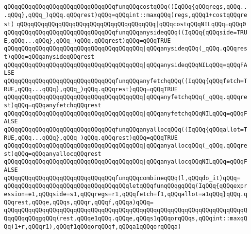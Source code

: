 \newline
\verb|qQQqqQQqqQQqqQQqqQQqqQQqqQQqqQQqfunqQQqcostqQQq((IqQQq{qQQqregs,qQQq...qQQq},qQQq_)qQQq.qQQqrest)qQQq=qQQqint::maxqQQq(regs,qQQq1+costqQQqrest)|\newline
\verb|qQQqqQQqqQQqqQQqqQQqqQQqqQQqqQQqqQQqqQQq|\verb#|qQQqcostqQQqNILqQQq=qQQq0#\newline
\newline
\verb|qQQqqQQqqQQqqQQqqQQqqQQqqQQqqQQqfunqQQqanysideqQQq((IqQQq{qQQqside=TRUE,qQQq...qQQq},qQQq_)qQQq.qQQqrest)qQQq=qQQqTRUE|\newline
\verb|qQQqqQQqqQQqqQQqqQQqqQQqqQQqqQQqqQQqqQQq|\verb#|qQQqanysideqQQq(_qQQq.qQQqrest)qQQq=qQQqanysideqQQqrest#\newline
\verb|qQQqqQQqqQQqqQQqqQQqqQQqqQQqqQQqqQQqqQQq|\verb#|qQQqanysideqQQqNILqQQq=qQQqFALSE#\newline
\newline
\verb|qQQqqQQqqQQqqQQqqQQqqQQqqQQqqQQqfunqQQqanyfetchqQQq((IqQQq{qQQqfetch=TRUE,qQQq...qQQq},qQQq_)qQQq.qQQqrest)qQQq=qQQqTRUE|\newline
\verb|qQQqqQQqqQQqqQQqqQQqqQQqqQQqqQQqqQQqqQQq|\verb#|qQQqanyfetchqQQq(_qQQq.qQQqrest)qQQq=qQQqanyfetchqQQqrest#\newline
\verb|qQQqqQQqqQQqqQQqqQQqqQQqqQQqqQQqqQQqqQQq|\verb#|qQQqanyfetchqQQqNILqQQq=qQQqFALSE#\newline
\newline
\verb|qQQqqQQqqQQqqQQqqQQqqQQqqQQqqQQqfunqQQqanyallocqQQq((IqQQq{qQQqallot=TRUE,qQQq...qQQq},qQQq_)qQQq.qQQqrest)qQQq=qQQqTRUE|\newline
\verb|qQQqqQQqqQQqqQQqqQQqqQQqqQQqqQQqqQQqqQQq|\verb#|qQQqanyallocqQQq(_qQQq.qQQqrest)qQQq=qQQqanyallocqQQqrest#\newline
\verb|qQQqqQQqqQQqqQQqqQQqqQQqqQQqqQQqqQQqqQQq|\verb#|qQQqanyallocqQQqNILqQQq=qQQqFALSE#\newline
\newline
\verb|qQQqqQQqqQQqqQQqqQQqqQQqqQQqqQQqfunqQQqcombineqQQq(l,qQQqdo_it)qQQq=|\newline
\verb|qQQqqQQqqQQqqQQqqQQqqQQqqQQqqQQqqQQqletqQQqfunqQQqgqQQq(IqQQq{qQQqexpression=e1,qQQqside=s1,qQQqregs=r1,qQQqfetch=f1,qQQqallot=a1qQQq}qQQq.qQQqrest,qQQqe,qQQqs,qQQqr,qQQqf,qQQqa)qQQq=|\newline
\verb|qQQqqQQqqQQqqQQqqQQqqQQqqQQqqQQqqQQqqQQqqQQqqQQqqQQqqQQqqQQqqQQqqQQqqQQqqQQqqQQqgqQQq(rest,qQQqe1qQQq.qQQqe,qQQqs1qQQqorqQQqs,qQQqint::maxqQQq(1+r,qQQqr1),qQQqf1qQQqorqQQqf,qQQqa1qQQqorqQQqa)|\newline
